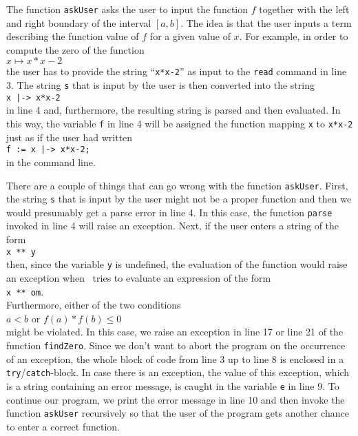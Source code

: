 The function \texttt{askUser} asks the user to input the function $f$ together with the left and
right boundary of the interval $[a,b]$.  The idea is that the user inputs a term describing the
function value of $f$ for a given value of $x$.  For example, in order to compute the zero of the
function
\\[0.2cm]
\hspace*{1.3cm}
$x \mapsto x*x - 2$
\\[0.2cm]
the user has to provide the string ``\texttt{x*x-2}'' as input to the \texttt{read} command in
line 3.  The string \texttt{s} that is input by the user is then converted into the string
\\[0.2cm]
\hspace*{1.3cm}
\texttt{x |-> x*x-2}
\\[0.2cm]
in line 4 and, furthermore, the resulting string is parsed and then evaluated.  In this way, the
variable \texttt{f} in line 4 will be assigned the function mapping \texttt{x} to \texttt{x*x-2}
just as if the user had written
\\[0.2cm]
\hspace*{1.3cm}
\texttt{f := x |-> x*x-2;}
\\[0.2cm]
in the command line.

 
There are a couple of things that can go wrong with the function \texttt{askUser}.  First,
the string \texttt{s} that is input by the user might not be a proper function and then
we would presumably get a parse error in line 4.  In this case, the function \texttt{parse}
invoked in line 4 will raise an exception. Next, if the user enters a string of the form
\\[0.2cm]
\hspace*{1.3cm}
\texttt{x ** y}
\\[0.2cm]
then, since the variable \texttt{y} is undefined, the evaluation of the function would
raise an exception when \setlx\ tries to evaluate an expression of the form
\\[0.2cm]
\hspace*{1.3cm}
\texttt{x ** om}.
\\[0.2cm]
Furthermore, either of the two conditions
\\[0.2cm]
\hspace*{1.3cm}
$a < b$ \quad or \quad $f(a) * f(b) \leq 0$
\\[0.2cm]
might be violated.  In this case, we raise an exception in line 17 or
line 21 of the function \texttt{findZero}.  
Since we don't want to abort the program on the occurrence of an exception, the whole block of
code from line 3 up to line 8 is enclosed in a \texttt{try}/\texttt{catch}-block.  In case there is
an exception, the value of this exception, which is a string containing an error message, is
caught in the variable \texttt{e} in line 9.  To continue our program, we print the error message
in line 10 and then invoke the function \texttt{askUser} recursively so that the user of
the program gets another chance to enter a correct function.

